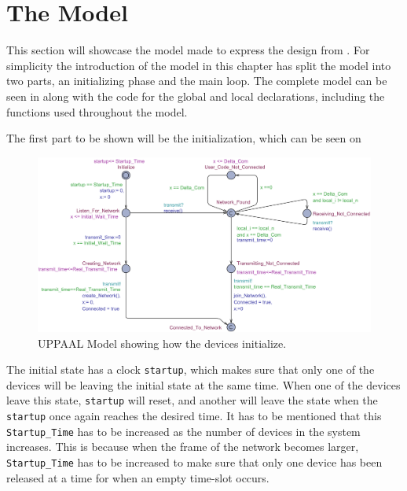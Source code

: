 \section{The Model}
This section will showcase the model made to express the design from .
For simplicity the introduction of the model in this chapter has split the model into two parts, an initializing phase and the main loop.
The complete model can be seen in  along with the code for the global and local declarations, including the functions used throughout the model.

The first part to be shown will be the initialization, which can be seen on 

\begin{figure}
  \includegraphics[width=1\textwidth]{Figures/Model/Device_Connecting.pdf} 
\caption{UPPAAL Model showing how the devices initialize.}
\label{fig:UPPAAL_Intitialization}
\end{figure}

The initial state has a clock \texttt{startup}, which makes sure that only one of the devices will be leaving the initial state at the same time.
When one of the devices leave this state, \texttt{startup} will reset, and another will leave the state when the \texttt{startup} once again reaches the desired time.
It has to be mentioned that this \texttt{Startup\_Time} has to be increased as the number of devices in the system increases.
This is because when the frame of the network becomes larger, \texttt{Startup\_Time} has to be increased to make sure that only one device has been released at a time for when an empty time-slot occurs.


